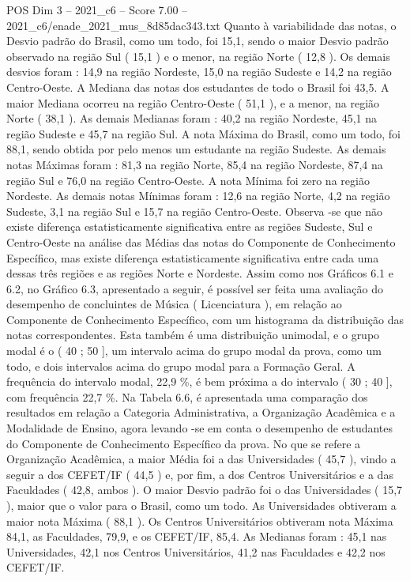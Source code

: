 \begin{textsample}{POS Dim 3 – 2021\_c6 – Score 7.00 – 2021\_c6/enade\_2021\_mus\_8d85dac343.txt}
Quanto à variabilidade das notas, o Desvio padrão do Brasil, como um todo, foi 15,1, sendo o maior Desvio padrão observado na região Sul ( 15,1 ) e o menor, na região Norte ( 12,8 ).
Os demais desvios foram : 14,9 na região Nordeste, 15,0 na região Sudeste e 14,2 na região Centro-Oeste.
A Mediana das notas dos estudantes de todo o Brasil foi 43,5.
A maior Mediana ocorreu na região Centro-Oeste ( 51,1 ), e a menor, na região Norte ( 38,1 ).
As demais Medianas foram : 40,2 na região Nordeste, 45,1 na região Sudeste e 45,7 na região Sul.
A nota Máxima do Brasil, como um todo, foi 88,1, sendo obtida por pelo menos um estudante na região Sudeste.
As demais notas Máximas foram : 81,3 na região Norte, 85,4 na região Nordeste, 87,4 na região Sul e 76,0 na região Centro-Oeste.
A nota Mínima foi zero na região Nordeste.
As demais notas Mínimas foram : 12,6 na região Norte, 4,2 na região Sudeste, 3,1 na região Sul e 15,7 na região Centro-Oeste.
Observa -se que não existe diferença estatisticamente significativa entre as regiões Sudeste, Sul e Centro-Oeste na análise das Médias das notas do Componente de Conhecimento Específico, mas existe diferença estatisticamente significativa entre cada uma dessas três regiões e as regiões Norte e Nordeste.
Assim como nos Gráficos 6.1 e 6.2, no Gráfico 6.3, apresentado a seguir, é possível ser feita uma avaliação do desempenho de concluintes de Música ( Licenciatura ), em relação ao Componente de Conhecimento Específico, com um histograma da distribuição das notas correspondentes.
Esta também é uma distribuição unimodal, e o grupo modal é o ( 40 ; 50 ], um intervalo acima do grupo modal da prova, como um todo, e dois intervalos acima do grupo modal para a Formação Geral.
A frequência do intervalo modal, 22,9 \%, é bem próxima a do intervalo ( 30 ; 40 ], com frequência 22,7 \%.
Na Tabela 6.6, é apresentada uma comparação dos resultados em relação a Categoria Administrativa, a Organização Acadêmica e a Modalidade de Ensino, agora levando -se em conta o desempenho de estudantes do Componente de Conhecimento Específico da prova.
No que se refere a Organização Acadêmica, a maior Média foi a das Universidades ( 45,7 ), vindo a seguir a dos CEFET/IF ( 44,5 ) e, por fim, a dos Centros Universitários e a das Faculdades ( 42,8, ambos ).
O maior Desvio padrão foi o das Universidades ( 15,7 ), maior que o valor para o Brasil, como um todo.
As Universidades obtiveram a maior nota Máxima ( 88,1 ).
Os Centros Universitários obtiveram nota Máxima 84,1, as Faculdades, 79,9, e os CEFET/IF, 85,4.
As Medianas foram : 45,1 nas Universidades, 42,1 nos Centros Universitários, 41,2 nas Faculdades e 42,2 nos CEFET/IF.

\end{textsample}
